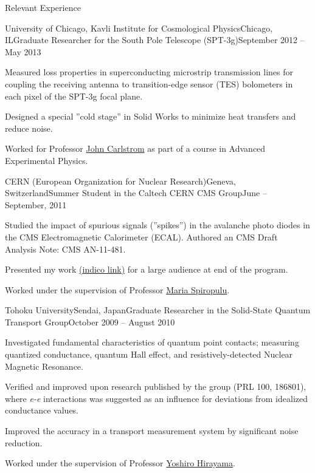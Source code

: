 \documentclass{resume}
\begin{document}
\begin{rsection}{Relevant Experience}
  \begin{rsubsection}{University of Chicago, Kavli Institute for Cosmological Physics}{Chicago, IL}{Graduate Researcher for the South Pole Telescope (SPT-3g)}{September 2012 -- May 2013}
  \item Measured loss properties in superconducting microstrip transmission lines for coupling the receiving antenna to transition-edge sensor (TES) bolometers in each pixel of the SPT-3g focal plane.
  \item Designed a special ''cold stage'' in Solid Works to minimize heat transfers and reduce noise. 
  \item Worked for Professor \href{https://kicp.uchicago.edu/people/profile/john_carlstrom.html}{John Carlstrom} as part of a course in Advanced Experimental Physics.
  \end{rsubsection}


  \begin{rsubsection}{CERN (European Organization for Nuclear Research)}{Geneva, Switzerland}{Summer Student in the Caltech CERN CMS Group}{June -- September, 2011}
  \item Studied the impact of spurious signals (''spikes'') in the avalanche photo diodes in the CMS Electromagnetic Calorimeter (ECAL). Authored an CMS Draft Analysis Note: CMS AN-11-481.
  \item Presented my work \href{http://indico.cern.ch/conferenceDisplay.py?confId=135576}{(indico link)} for a large audience at end of the program.
  \item Worked under the supervision of Professor \href{http://www.hep.caltech.edu/~smaria/}{Maria Spiropulu}.
  \end{rsubsection}


  \begin{rsubsection}{Tohoku University}{Sendai, Japan}{Graduate Researcher in the Solid-State Quantum Transport Group}{October 2009 -- August 2010}
  \item Investigated fundamental characteristics of quantum point contacts; measuring quantized conductance, quantum Hall effect, and resistively-detected Nuclear Magnetic Resonance.
  \item Verified and improved upon research published by the group (PRL 100, 186801), where \textit{e-e} interactions was suggested as an influence for deviations from idealized conductance values.
  \item Improved the accuracy in a transport measurement system by significant noise reduction.
  \item Worked under the supervision of Professor \href{http://quant-trans.org/lab/profile-e.html}{Yoshiro Hirayama}.
  \end{rsubsection}


\end{rsection}
\end{document}
